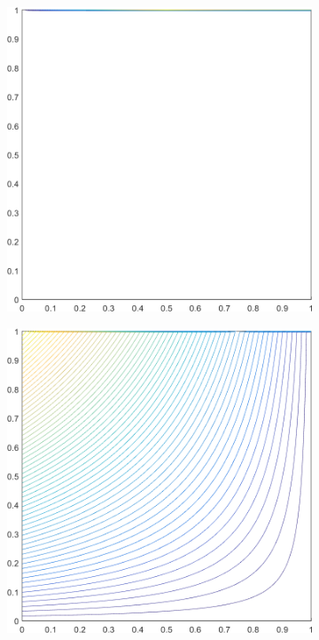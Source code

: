 \begin{figure}
\label{fig::2D_WACHSPRESS1_deg_square_basis_functions}
\centering
	\begin{subfigure}[b]{0.39\textwidth}
		\centering
		\includegraphics[width=\textwidth]{figures/sec_BF/deg_square_WACHSPRESS1_contour_b4.png}
		\caption{}
	\end{subfigure}
	\vfill
	\begin{subfigure}[b]{0.39\textwidth}
		\centering
		\includegraphics[width=\textwidth]{figures/sec_BF/deg_square_WACHSPRESS1_contour_b5.png}

\end{subfigure}
\end{figure}
